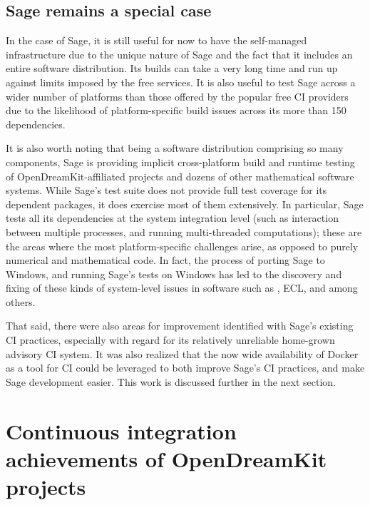 \documentclass{deliverablereport}
\begin{document}

\subsection{Sage remains a special case}
In the case of Sage, it is still useful for now to have the self-managed
infrastructure due to the unique nature of Sage and the fact that it includes
an entire software distribution.  Its builds can take a very long time and run
up against limits imposed by the free services.  It is also useful to test
Sage across a wider number of platforms than those offered by the popular free
CI providers due to the likelihood of platform-specific build issues across its
more than 150 dependencies.

It is also worth noting that being a software distribution comprising so many
components, Sage is providing implicit cross-platform build and runtime testing of
OpenDreamKit-affiliated projects and dozens of other mathematical software
systems.  While Sage's test suite does not provide full test coverage for its
dependent packages, it does exercise most of them extensively.  In particular,
Sage tests all its dependencies at the system integration level (such as
interaction between multiple processes, and running multi-threaded
computations); these are the areas where the most platform-specific challenges
arise, as opposed to purely numerical and mathematical code.  In fact, the
process of porting Sage to Windows, and running Sage's tests on Windows
 has led to the discovery and fixing of these kinds of
system-level issues in software such as \GAP, ECL, and \PariGP among
others.

That said, there were also areas for improvement identified with Sage's
existing CI practices, especially with regard for its relatively unreliable
home-grown advisory CI system.  It was also realized that the now wide
availability of Docker as a tool for CI could be leveraged to both improve
Sage's CI practices, and make Sage development easier.  This work is discussed
further in the next section.




\hypertarget{project-reports}{%
\section{Continuous integration achievements of OpenDreamKit projects}\label{project-reports}}
\end{document}
